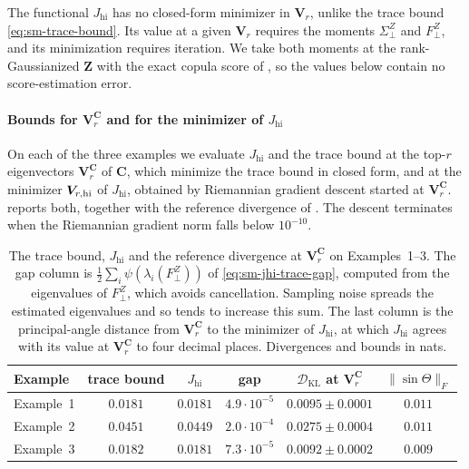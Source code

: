 \documentclass[supplement,review,hidelinks,onefignum,onetabnum]{siamart251216}
\newcommand{\DKL}{\mathcal{D}_{\mathrm{KL}}}
\newcommand{\mC}{\bm{C}}
\newcommand{\mV}{\bm{V}}
\newcommand{\vZ}{\bm{Z}}
\begin{document}
The functional $J_{\mathrm{hi}}$ has no closed-form minimizer in $\mV_r$, unlike the trace bound \eqref{eq:sm-trace-bound}. Its value at a given $\mV_r$ requires the moments $\Sigma^Z_\perp$ and $F^Z_\perp$, and its minimization requires iteration. We take both moments at the rank-Gaussianized $\vZ$ with the exact copula score of , so the values below contain no score-estimation error.

\paragraph{Bounds for $\mV_r^{\mC}$ and for the minimizer of $J_{\mathrm{hi}}$} On each of the three examples we evaluate $J_{\mathrm{hi}}$ and the trace bound at the top-$r$ eigenvectors $\mV_r^{\mC}$ of $\mC$, which minimize the trace bound in closed form, and at the minimizer $\mV_{r,\rm hi}$ of $J_{\mathrm{hi}}$, obtained by Riemannian gradient descent \cite{AbsilMahonySepulchre2008} started at $\mV_r^{\mC}$.  reports both, together with the reference divergence of . The descent terminates when the Riemannian gradient norm falls below $10^{-10}$.

\begin{table}[h]
\centering\small
\caption{The trace bound, $J_{\mathrm{hi}}$ and the reference divergence at $\mV_r^{\mC}$ on Examples~1--3. The gap column is $\tfrac12\sum_i\psi(\lambda_i(F^Z_\perp))$ of \eqref{eq:sm-jhi-trace-gap}, computed from the eigenvalues of $F^Z_\perp$, which avoids cancellation. Sampling noise spreads the estimated eigenvalues and so tends to increase this sum. The last column is the principal-angle distance from $\mV_r^{\mC}$ to the minimizer of $J_{\mathrm{hi}}$, at which $J_{\mathrm{hi}}$ agrees with its value at $\mV_r^{\mC}$ to four decimal places. Divergences and bounds in nats.}
\label{tab:sm-jhi}
\begin{tabular}{l|ccc|c|c}
\toprule
Example & trace bound & $J_{\mathrm{hi}}$ & gap & $\DKL$ at $\mV_r^{\mC}$ & $\|\sin\Theta\|_F$ \\
\midrule
Example~1 & $0.0181$ & $0.0181$ & $4.9\cdot10^{-5}$ & $0.0095{\pm}0.0001$ & $0.011$ \\
Example~2 & $0.0451$ & $0.0449$ & $2.0\cdot10^{-4}$ & $0.0275{\pm}0.0004$ & $0.011$ \\
Example~3 & $0.0182$ & $0.0181$ & $7.3\cdot10^{-5}$ & $0.0092{\pm}0.0002$ & $0.009$ \\
\bottomrule
\end{tabular}
\end{table}
\end{document}
